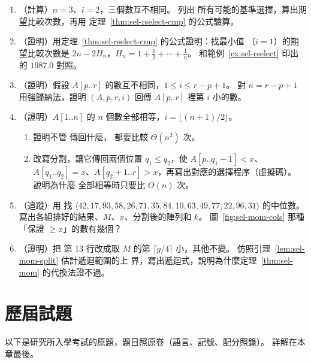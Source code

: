 \begin{enumerate}
\item \label{sel-q-n3}（計算）$n = 3$、$i = 2$，三個數互不相同。 列出
 所有可能的基準選擇，算出期望比較次數，再用
定理~\ref{thm:sel-rselect-cmp} 的公式驗算。

\item \label{sel-q-min}（證明）用定理~\ref{thm:sel-rselect-cmp} 的公式證明：找最小值
（$i = 1$）的期望比較次數是 $2n - 2H_n$，$H_n = 1 + \frac{1}{2} + \cdots + \frac{1}{n}$。
和範例~\ref{ex:sel-rselect} 印出的 $1987.0$ 對照。

\item \label{sel-q-correct}（證明）假設 $A[p..r]$ 的數互不相同，$1 \le i \le r - p + 1$。
對 $n = r - p + 1$ 用強歸納法，證明 $(A, p, r, i)$ 回傳
$A[p..r]$ 裡第 $i$ 小的數。

\item \label{sel-q-dup}（證明）$A[1..n]$ 的 $n$ 個數全部相等，$i = \lfloor (n+1)/2 \rfloor$。
\begin{enumerate}
\item 證明不管  傳回什麼， 都要比較
$\Theta(n^2)$ 次。
\item 改寫分割，讓它傳回兩個位置 $q_1 \le q_2$，使 $A[p..q_1 - 1] < x$、
$A[q_1..q_2] = x$、$A[q_2 + 1..r] > x$，再寫出對應的選擇程序（虛擬碼）。 說明為什麼
全部相等時只要比 $O(n)$ 次。
\end{enumerate}

\item \label{sel-q-mom15}（追蹤）用  找
$\langle 42, 17, 93, 58, 26, 71, 35, 84, 10, 63, 49, 77, 22, 96, 31 \rangle$ 的中位數。
寫出各組排好的結果、$M$、$x$、分割後的陣列和 $k$。 圖~\ref{fig:sel-mom-cols} 那種
「保證 $\ge x$」的數有幾個？

\item \label{sel-q-quarter}（證明）把  第 13 行改成取 $M$ 的第
$\lceil g/4 \rceil$ 小，其他不變。 仿照引理~\ref{lem:sel-mom-split} 估計遞迴範圍的上
界，寫出遞迴式，說明為什麼定理~\ref{thm:sel-mom} 的代換法證不過。

\end{enumerate}

\section{歷屆試題}
\label{sec:sel-pastexam}

以下是研究所入學考試的原題，題目照原卷（語言、記號、配分照錄）。 詳解在本章最後。


